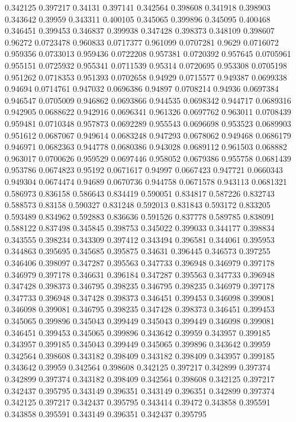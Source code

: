 0.342125 0.397217
0.34131 0.397141
0.342564 0.398608
0.341918 0.398903
0.343642 0.39959
0.343311 0.400105
0.345065 0.399896
0.345095 0.400468
0.346451 0.399453
0.346837 0.399938
0.347428 0.398373
0.348109 0.398607
0.96272 0.0723478
0.960833 0.0717377
0.961099 0.0707281
0.9629 0.0716072
0.959356 0.0733013
0.959436 0.0722208
0.957381 0.0720392
0.957645 0.0705961
0.955151 0.0725932
0.955341 0.0711539
0.95314 0.0720695
0.953308 0.0705198
0.951262 0.0718353
0.951393 0.0702658
0.94929 0.0715577
0.949387 0.0699338
0.94694 0.0714761
0.947032 0.0696386
0.94897 0.0708214
0.94936 0.0697384
0.946547 0.0705009
0.946862 0.0693866
0.944535 0.0698342
0.944717 0.0689316
0.942905 0.0688622
0.942916 0.0696341
0.961326 0.0697762
0.963011 0.0708439
0.959481 0.0710348
0.957873 0.0692289
0.955543 0.0696698
0.953523 0.0689903
0.951612 0.0687067
0.949614 0.0683248
0.947293 0.0678062
0.949468 0.0686179
0.946971 0.0682363
0.944778 0.0680386
0.943028 0.0689112
0.961503 0.068882
0.963017 0.0700626
0.959529 0.0697446
0.958052 0.0679386
0.955758 0.0681439
0.953786 0.0674823
0.95192 0.0671617
0.94997 0.0667423
0.947721 0.0660343
0.949304 0.0674474
0.94689 0.0670736
0.944758 0.0671578
0.943113 0.0681321
0.586973 0.836158
0.586643 0.834419
0.590051 0.834817
0.587226 0.832743
0.588573 0.83158
0.590327 0.831248
0.592013 0.831843
0.593172 0.833205
0.593489 0.834962
0.592883 0.836636
0.591526 0.837778
0.589785 0.838091
0.588122 0.837498
0.345845 0.398753
0.345022 0.399033
0.344177 0.398834
0.343555 0.398234
0.343309 0.397412
0.343494 0.396581
0.344061 0.395953
0.344863 0.395695
0.345685 0.395875
0.34631 0.396445
0.346573 0.397255
0.346406 0.398097
0.347287 0.395563
0.347733 0.396948
0.346979 0.397178
0.346979 0.397178
0.346631 0.396184
0.347287 0.395563
0.347733 0.396948
0.347428 0.398373
0.346795 0.398235
0.346795 0.398235
0.346979 0.397178
0.347733 0.396948
0.347428 0.398373
0.346451 0.399453
0.346098 0.399081
0.346098 0.399081
0.346795 0.398235
0.347428 0.398373
0.346451 0.399453
0.345065 0.399896
0.345043 0.399449
0.345043 0.399449
0.346098 0.399081
0.346451 0.399453
0.345065 0.399896
0.343642 0.39959
0.343957 0.399185
0.343957 0.399185
0.345043 0.399449
0.345065 0.399896
0.343642 0.39959
0.342564 0.398608
0.343182 0.398409
0.343182 0.398409
0.343957 0.399185
0.343642 0.39959
0.342564 0.398608
0.342125 0.397217
0.342899 0.397374
0.342899 0.397374
0.343182 0.398409
0.342564 0.398608
0.342125 0.397217
0.342437 0.395795
0.343149 0.396351
0.343149 0.396351
0.342899 0.397374
0.342125 0.397217
0.342437 0.395795
0.343414 0.39472
0.343858 0.395591
0.343858 0.395591
0.343149 0.396351
0.342437 0.395795
